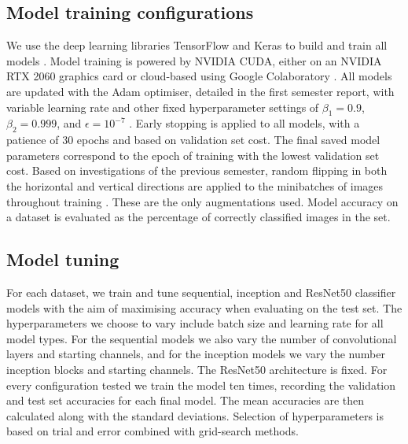 \documentclass[12pt]{article}
\begin{document}
\subsection{Model training configurations}
We use the deep learning libraries TensorFlow and Keras to build and train all models \cite{Abadi16, Gulli17}. Model training is powered by NVIDIA CUDA, either on an NVIDIA RTX 2060 graphics card or cloud-based using Google Colaboratory \cite{Cook12, Bisong19}. All models are updated with the Adam optimiser, detailed in the first semester report, with variable learning rate and other fixed hyperparameter settings of $\beta_1=0.9$, $\beta_2=0.999$, and $\epsilon=10^{-7}$ \cite{Heaton20, Kingma14}. Early stopping is applied to all models, with a patience of 30 epochs and based on validation set cost. The final saved model parameters correspond to the epoch of training with the lowest validation set cost. Based on investigations of the previous semester, random flipping in both the horizontal and vertical directions are applied to the minibatches of images throughout training \cite{Heaton20}. These are the only augmentations used. Model accuracy on a dataset is evaluated as the percentage of correctly classified images in the set. 

\subsection{Model tuning}
For each dataset, we train and tune sequential, inception and ResNet50 classifier models with the aim of maximising accuracy when evaluating on the test set. The hyperparameters we choose to vary include batch size and learning rate for all model types. For the sequential models we also vary the number of convolutional layers and starting channels, and for the inception models we vary the number inception blocks and starting channels. The ResNet50 architecture is fixed. For every configuration tested we train the model ten times, recording the validation and test set accuracies for each final model. The mean accuracies are then calculated along with the standard deviations. Selection of hyperparameters is based on trial and error combined with grid-search methods.

\end{document}

